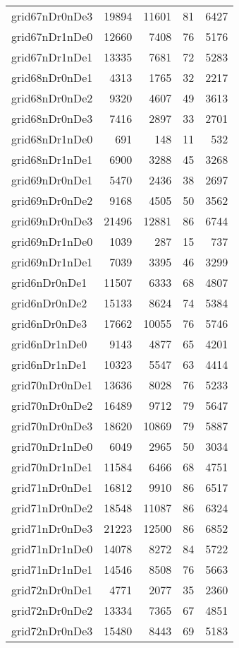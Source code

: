 \documentclass[../../../thesis.tex]{subfiles}
\begin{document}
\begin{longtable}{lrrrr}
grid67nDr0nDe3 & 19894 & 11601 & 81 & 6427 \\
grid67nDr1nDe0 & 12660 & 7408 & 76 & 5176 \\
grid67nDr1nDe1 & 13335 & 7681 & 72 & 5283 \\
grid68nDr0nDe1 & 4313 & 1765 & 32 & 2217 \\
grid68nDr0nDe2 & 9320 & 4607 & 49 & 3613 \\
grid68nDr0nDe3 & 7416 & 2897 & 33 & 2701 \\
grid68nDr1nDe0 & 691 & 148 & 11 & 532 \\
grid68nDr1nDe1 & 6900 & 3288 & 45 & 3268 \\
grid69nDr0nDe1 & 5470 & 2436 & 38 & 2697 \\
grid69nDr0nDe2 & 9168 & 4505 & 50 & 3562 \\
grid69nDr0nDe3 & 21496 & 12881 & 86 & 6744 \\
grid69nDr1nDe0 & 1039 & 287 & 15 & 737 \\
grid69nDr1nDe1 & 7039 & 3395 & 46 & 3299 \\
grid6nDr0nDe1 & 11507 & 6333 & 68 & 4807 \\
grid6nDr0nDe2 & 15133 & 8624 & 74 & 5384 \\
grid6nDr0nDe3 & 17662 & 10055 & 76 & 5746 \\
grid6nDr1nDe0 & 9143 & 4877 & 65 & 4201 \\
grid6nDr1nDe1 & 10323 & 5547 & 63 & 4414 \\
grid70nDr0nDe1 & 13636 & 8028 & 76 & 5233 \\
grid70nDr0nDe2 & 16489 & 9712 & 79 & 5647 \\
grid70nDr0nDe3 & 18620 & 10869 & 79 & 5887 \\
grid70nDr1nDe0 & 6049 & 2965 & 50 & 3034 \\
grid70nDr1nDe1 & 11584 & 6466 & 68 & 4751 \\
grid71nDr0nDe1 & 16812 & 9910 & 86 & 6517 \\
grid71nDr0nDe2 & 18548 & 11087 & 86 & 6324 \\
grid71nDr0nDe3 & 21223 & 12500 & 86 & 6852 \\
grid71nDr1nDe0 & 14078 & 8272 & 84 & 5722 \\
grid71nDr1nDe1 & 14546 & 8508 & 76 & 5663 \\
grid72nDr0nDe1 & 4771 & 2077 & 35 & 2360 \\
grid72nDr0nDe2 & 13334 & 7365 & 67 & 4851 \\
grid72nDr0nDe3 & 15480 & 8443 & 69 & 5183 \\

\end{longtable}
\end{document}
